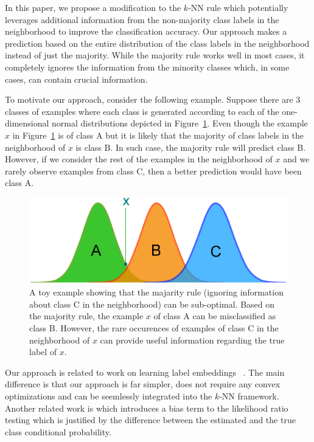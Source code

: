 \documentclass{article}
\begin{document}
In this paper, we propose a modification to the $k$-NN rule which
potentially leverages additional information from the non-majority
class labels in the neighborhood to improve the classification
accuracy. Our approach makes a prediction based on the entire
distribution of the class labels in the neighborhood instead of just
the majority. While the majority rule works well in most cases, it
completely ignores the information from the minority classes which, in
some cases, can contain crucial information.

To motivate our approach, consider the following example. Suppose
there are 3 classes of examples where each class is generated
according to each of the one-dimensional normal distributions depicted in
Figure~\ref{fig:toy_example}. Even though the example $x$ in
Figure~\ref{fig:toy_example} is of class A but it is likely that the
majority of class labels in the neighborhood of $x$ is class B. In
such case, the majority rule will predict class B. However, if we
consider the rest of the examples in the neighborhood of $x$ and we
rarely observe examples from class C, then a better prediction would
have been class A.

\begin{figure}[ht]
\vskip 0.2in
\begin{center}
\centerline{\includegraphics[width=\columnwidth]{figures/toy_example.eps}}
\caption{A toy example showing that the majarity rule (ignoring
  information about class C in the neighborhood) can be
  sub-optimal. Based on the majority rule, the example $x$ of class A
  can be misclassified as class B. However, the rare occurences of
  examples of class C in the neighborhood of $x$ can provide
  useful information regarding the true label of $x$.}
\label{fig:toy_example}
\end{center}
\vskip -0.2in
\end{figure} 

Our approach is related to work on learning label embeddings~
\cite{Collins2009, Bengio2010}. The main difference is that our approach is far
simpler, does not require any convex optimizations and can be
seemlessly integrated into the $k$-NN framework. Another related work
is \cite{Bilmes2001} which introduces a bias term to the likelihood ratio
testing which is justified by the difference between the estimated and
the true class conditional probability.
\end{document}
